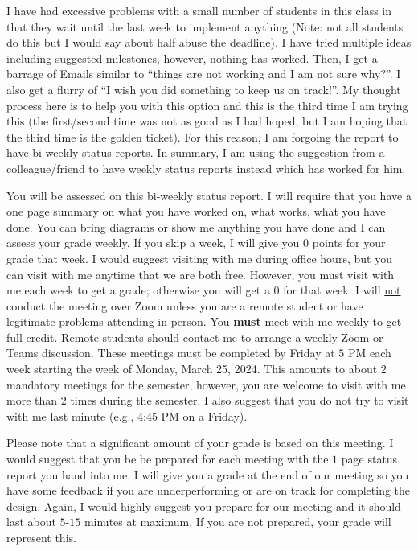 \documentclass[times, 10pt, twocolumn]{IEEEtran}
\begin{document}
I have had excessive problems with a small number of students in this
class in that they wait until
the last week to implement anything (Note: not all students do this
but I would say about half abuse the deadline).  I have tried multiple ideas
including suggested milestones, however, nothing has worked.
Then, I get a barrage of Emails
similar to ``things are not working and I am not sure why?''.
I also get a flurry of ``I wish you did something to keep us on track!''.  My
thought process here is to help you with this option and this is the third
time I am trying this (the first/second time was not as good as I had hoped,
but I am hoping that the third time is the golden ticket).
For this reason, I am forgoing the report to have bi-weekly status reports.
In summary, I am
using the suggestion from a colleague/friend to have weekly status
reports instead which has worked for him.  

You will be assessed on this bi-weekly status report.
I will require that you have a
one page summary on what you have worked on, what works, what you have done.
You can bring diagrams or show me anything you have done and I can
assess your grade weekly.
If you skip a week, I will give you $0$ points for your grade that
week.  I would
suggest visiting with me during office hours, but you can visit with me
anytime that we are both free.  However, you must visit with
me each week to get a grade; otherwise you will get a $0$ for that
week.
I will \underline{not} conduct the meeting over 
Zoom unless you are a remote student
or have legitimate problems attending in person.
You \textbf{must} meet with me
weekly to get full credit.  Remote students
should contact me to arrange a weekly Zoom or Teams
discussion.  These meetings must be completed by Friday at $5$ PM each week
starting the week of Monday, March 25, 2024.  This amounts to about $2$
mandatory meetings for the semester, however, you are welcome to visit with me
more than $2$ times during the semester.  I also suggest that you do not
try to visit with me last minute (e.g., 4:45 PM on a Friday).

Please note that a significant amount of your grade is based on this
meeting.  I would suggest that you be be prepared
for each meeting with the $1$ page status report you hand into
me.  I will give you a grade at the end of our meeting
so you have some feedback if you are underperforming or are on track
for completing the design.  Again, I would highly suggest you prepare
for our meeting and it should last about $5$-$15$ minutes at maximum.
If you are not prepared, your grade will represent this.
\end{document}
